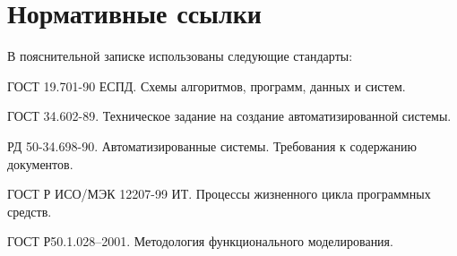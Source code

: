{
	\titleformat{\section}[block]{\centering\normalfont\large\bfseries}{\thesection}{10pt}{}
	\section*{\centering Нормативные ссылки}
}


	В пояснительной записке использованы следующие стандарты: 

	ГОСТ 19.701-90 ЕСПД. Схемы алгоритмов, программ, данных и систем.

	ГОСТ 34.602-89.  Техническое задание на создание автоматизированной системы.


	РД 50-34.698-90. Автоматизированные системы. Требования к содержанию документов.

	ГОСТ Р ИСО/МЭК 12207-99 ИТ. Процессы жизненного цикла программных средств.

	ГОСТ Р50.1.028–2001. Методология функционального моделирования.

\pagebreak